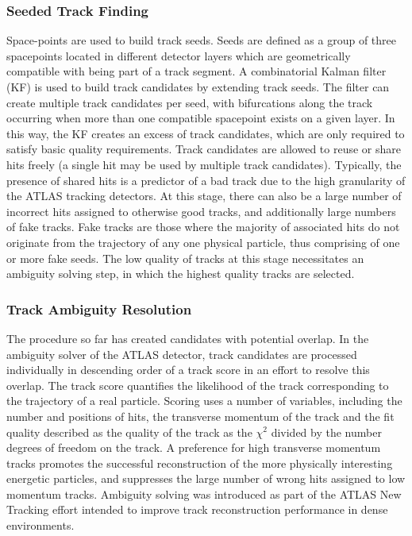 \subsubsection{Seeded Track Finding}
Space-points are used to build track seeds. Seeds are defined as a group of three spacepoints located in different detector layers which are geometrically compatible with being part of a track segment. A combinatorial Kalman filter (KF) is used to build track candidates by extending track seeds. The filter can create multiple track candidates per seed, with bifurcations along the track occurring when more than one compatible spacepoint exists on a given layer. In this way, the KF creates an excess of track candidates, which are only required to satisfy basic quality requirements. Track candidates are allowed to reuse or share hits freely (a single hit may be used by multiple track candidates). Typically, the presence of shared hits is a predictor of a bad track due to the high granularity of the ATLAS tracking detectors. At this stage, there can also be a large number of incorrect hits assigned to otherwise good tracks, and additionally large numbers of fake tracks. Fake tracks are those where the majority of associated hits do not originate from the trajectory of any one physical particle, thus comprising of one or more fake seeds. The low quality of tracks at this stage necessitates an ambiguity solving step, in which the highest quality tracks are selected.

\subsubsection{Track Ambiguity Resolution}

The procedure so far has created candidates with potential overlap. In the ambiguity solver of the ATLAS detector, track candidates are processed individually in descending order of a track score in an effort to resolve this overlap. The track score quantifies the likelihood of the track corresponding to the trajectory of a real particle. Scoring uses a number of variables, including the number and positions of hits, the transverse momentum of the track and the fit quality described as the quality of the track as the $\chi^{2}$ divided by the number degrees of freedom on the track. A preference for high transverse momentum tracks promotes the successful reconstruction of the more physically interesting energetic particles, and suppresses the large number of wrong hits assigned to low momentum tracks. Ambiguity solving was introduced as part of the ATLAS New Tracking effort \cite{Cornelissen:2007vba} intended to improve track reconstruction performance in dense environments. 


